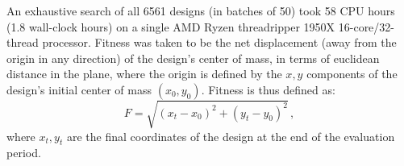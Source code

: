 An exhaustive search of all 6561 designs (in batches of 50) took 58 CPU hours (1.8 wall-clock hours) on a single AMD Ryzen threadripper 1950X 16-core/32-thread processor.
Fitness was taken to be the net displacement (away from the origin in any direction) of the design's center of mass, in terms of euclidean distance in the plane,
where the origin is defined by the $x,y$ components of the design's initial center of mass $(x_0, y_0)$.
Fitness is thus defined as:
\begin{equation}
    \label{eq:fitness}
    F=\sqrt{(x_t-x_0)^2+(y_t-y_0)^2} \,,
\end{equation}
where $x_t,y_t$ are the final coordinates of the design at the end of the evaluation period.
